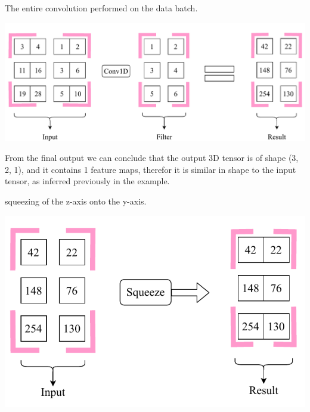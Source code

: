 \documentclass[a4paper, 12pt]{report}
\begin{document}
\begin{blockfigure}{The entire convolution performed on the data batch.}
	\begin{center}
		\includegraphics[width = \textwidth]{secondConvSample_final}
	\end{center}
\end{blockfigure}
\vspace{40pt}
From the final output we can conclude that the output 3D tensor is of shape (3, 2, 1), and it contains 1 feature maps, therefor it is similar in shape to the input tensor, as inferred previously in the example.
\vspace{40pt}
\begin{blockfigure}{squeezing of the z-axis onto the y-axis.}
	\begin{center}
		\includegraphics[width = \textwidth]{squeeze}
	\end{center}
\end{blockfigure}
\newpage
\end{document}
